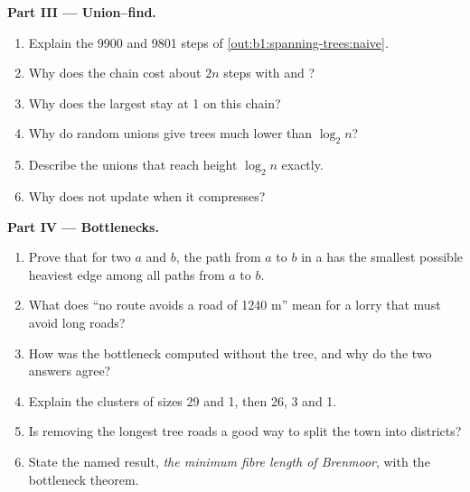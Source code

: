 \begin{problem}
\medskip\noindent\textbf{Part III --- Union--find.}
\begin{enumerate}[resume]
\item Explain the 9900 and 9801 steps of \cref{out:b1:spanning-trees:naive}.
\item Why does the chain cost about $2n$ steps with  and ?
\item Why does the largest  stay at 1 on this chain?
\item Why do random unions give trees much lower than $\log_2 n$?
\item Describe the unions that reach height $\log_2 n$ exactly.
\item Why does  not update  when it compresses?
\end{enumerate}

\medskip\noindent\textbf{Part IV --- Bottlenecks.}
\begin{enumerate}[resume]
\item Prove that for two  $a$ and $b$, the path from $a$ to $b$ in a  has the smallest
possible heaviest edge among all paths from $a$ to $b$.
\item What does ``no route avoids a road of 1240 m'' mean for a lorry that must avoid long roads?
\item How was the bottleneck computed without the tree, and why do the two answers agree?
\item Explain the clusters of sizes 29 and 1, then 26, 3 and 1.
\item Is removing the longest tree roads a good way to split the town into districts?
\item State the named result, \emph{the minimum fibre length of Brenmoor}, with the bottleneck theorem.
\end{enumerate}
\end{problem}
